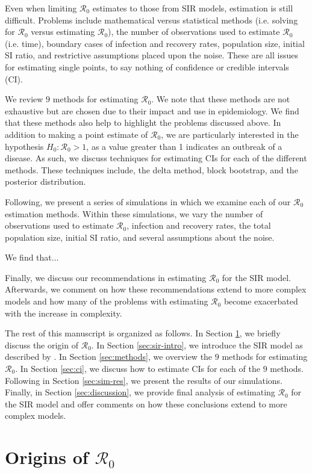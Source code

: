 \documentclass[12pt]{article}
\newcommand{\xxsir}{\ensuremath{9}} %
\newcommand{\rr}{\ensuremath{\mathcal{R}_0}}
\begin{document}
Even when limiting $\rr$ estimates to those from SIR models, estimation is still difficult.  Problems include mathematical versus statistical methods (i.e. solving for $\rr$ versus estimating $\rr$), the number of observations used to estimate $\rr$ (i.e. time), boundary cases of infection and recovery rates, population size, initial SI ratio, and restrictive assumptions placed upon the noise.  These are all issues for estimating single points, to say nothing of confidence or credible intervals (CI).

We review $\xxsir$ methods for estimating $\rr$.  We note that these methods are not exhaustive but are chosen due to their impact and use in epidemiology.  We find that these methods also help to highlight the problems discussed above.  In addition to making a point estimate of $\rr$, we are particularly interested in the hypothesis  $H_0: \rr > 1$, as a value greater than 1 indicates an outbreak of a disease.  As such, we discuss techniques for estimating CIs for each of the different methods.  These techniques include, the delta method, block bootstrap, and the posterior distribution.

Following, we present a series of simulations in which we examine each of our $\rr$ estimation methods.  Within these simulations, we vary the number of observations used to estimate $\rr$, infection and recovery rates, the total population size, initial SI ratio, and several assumptions about the noise.

We find that...

Finally, we discuss our recommendations in estimating $\rr$ for the SIR model.  Afterwards, we comment on how these recommendations extend to more complex models and how many of the problems with estimating $\rr$  become exacerbated with the increase in complexity.


The rest of this manuscript is organized as follows.  In Section \ref{sec:r0}, we briefly discuss the origin of $\rr$.  In Section \ref{sec:sir-intro}, we introduce the SIR model as described by \cite{Kermack700}.  In Section \ref{sec:methods}, we overview the $\xxsir$ methods for estimating $\rr$. In Section \ref{sec:ci}, we discuss how to estimate CIs for each of the $\xxsir$ methods.  Following in Section \ref{sec:sim-res}, we present the results of our simulations.  Finally, in Section \ref{sec:discussion}, we provide final analysis of estimating $\rr$ for the SIR model and offer comments on how these conclusions extend to more complex models.


\section{Origins of $\rr$}
\label{sec:r0}
\end{document}
